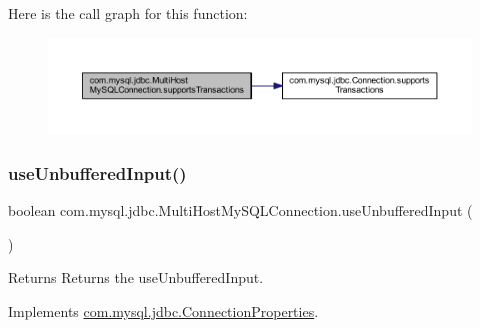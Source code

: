 Here is the call graph for this function\+:
\nopagebreak
\begin{figure}[H]
\begin{center}
\leavevmode
\includegraphics[width=350pt]{classcom_1_1mysql_1_1jdbc_1_1_multi_host_my_s_q_l_connection_a356916a7b3d5204fdd9886f9925816e7_cgraph}
\end{center}
\end{figure}
\mbox{\label{classcom_1_1mysql_1_1jdbc_1_1_multi_host_my_s_q_l_connection_a5a985fc8b9a0777d6d19e566e8053832}} 
\subsubsection{\texorpdfstring{use\+Unbuffered\+Input()}{useUnbufferedInput()}}
{\footnotesize\ttfamily boolean com.\+mysql.\+jdbc.\+Multi\+Host\+My\+S\+Q\+L\+Connection.\+use\+Unbuffered\+Input (\begin{DoxyParamCaption}{ }\end{DoxyParamCaption})}

\begin{DoxyReturn}{Returns}
Returns the use\+Unbuffered\+Input. 
\end{DoxyReturn}


Implements \mbox{\hyperlink{interfacecom_1_1mysql_1_1jdbc_1_1_connection_properties_ae9cefafa60524eaec697493db7349cc1}{com.\+mysql.\+jdbc.\+Connection\+Properties}}.

